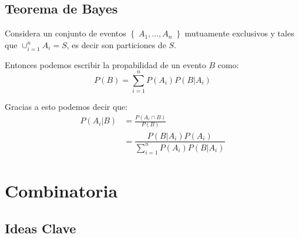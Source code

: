 \documentclass[12pt, fleqn]{report}                             %
\theoremstyle{break}                                            %
\newcommand{\Set}[1]{\left\{ \; #1 \; \right\}}                 %
\begin{document}
        \clearpage
        \section{Teorema de Bayes}

            Considera un conjunto de eventos $\Set{A_1, \dots, A_n}$ mutuamente exclusivos
      		y tales que $\cup_{i=1}^n A_i = S$, es decir son particiones de $S$.

      		Entonces podemos escribir la propabilidad de un evento $B$ como:
      		\begin{equation*}
      			P(B) 
      				= \sum_{i = 1}^n P(A_i) P(B | A_i)
      		\end{equation*}


      		Gracias a esto podemos decir que:
      		\begin{align*}
      			P(A_i | B) 
      				&= \frac{P(A_i \cap B)}{P(B)}									\\
      				&= \dfrac{P(B | A_i)P(A_i)}{\displaystyle \sum_{i = 1}^n P(A_i) P(B | A_i)}
      		\end{align*}








    \chapter{Combinatoria}

        \clearpage
        \section{Ideas Clave}

            
\end{document}

